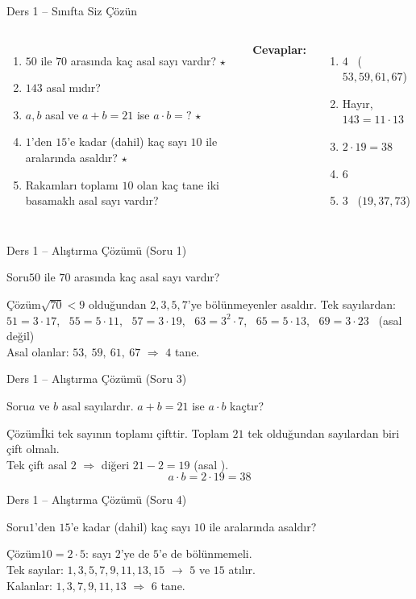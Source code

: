 \documentclass[aspectratio=169,11pt,handout]{beamer}
\newcommand{\soru}[3]{%
\begin{frame}{#1}
  \begin{block}{Soru}\large #2\end{block}
  \pause
  \begin{exampleblock}{Çözüm}\large #3\end{exampleblock}
\end{frame}}
\begin{document}
\begin{frame}{Ders 1 -- Sınıfta Siz Çözün}
\begin{columns}[t]
\begin{enumerate}
\item \(50\) ile \(70\) arasında kaç asal sayı vardır? \(\star\)
\item \(143\) asal mıdır?
\item \(a,b\) asal ve \(a+b=21\) ise \(a\cdot b=?\) \(\star\)
\item \(1\)'den \(15\)'e kadar (dahil) kaç sayı \(10\) ile aralarında asaldır? \(\star\)
\item Rakamları toplamı \(10\) olan kaç tane iki basamaklı asal sayı vardır?
\end{enumerate}
\pause
\textbf{Cevaplar:}
\begin{enumerate}
\item \(4\) \ (\(53,59,61,67\))
\item Hayır, \(143=11\cdot 13\)
\item \(2\cdot 19=38\)
\item \(6\)
\item \(3\) \ (\(19,37,73\))
\end{enumerate}
\end{columns}
\vspace{4pt}{\footnotesize \(\star\) işaretli soruların adım adım çözümü sonraki slaytlardadır.}
\end{frame}

\soru{Ders 1 -- Alıştırma Çözümü (Soru 1)}
{\(50\) ile \(70\) arasında kaç asal sayı vardır?}
{\(\sqrt{70}<9\) olduğundan \(2,3,5,7\)'ye bölünmeyenler asaldır. Tek sayılardan:\\[3pt]
\(51=3\cdot17\), \ \(55=5\cdot 11\), \ \(57=3\cdot 19\), \ \(63=3^2\cdot 7\), \ \(65=5\cdot 13\), \ \(69=3\cdot 23\) \ (asal değil)\\[3pt]
Asal olanlar: \(53,\ 59,\ 61,\ 67\) \(\Rightarrow\) \(4\) tane.}

\soru{Ders 1 -- Alıştırma Çözümü (Soru 3)}
{\(a\) ve \(b\) asal sayılardır. \(a+b=21\) ise \(a\cdot b\) kaçtır?}
{İki tek sayının toplamı çifttir. Toplam \(21\) tek olduğundan sayılardan biri çift olmalı.\\[3pt]
Tek çift asal \(2\) \(\Rightarrow\) diğeri \(21-2=19\) (asal \checkmark).
\[a\cdot b=2\cdot 19=38\]}

\soru{Ders 1 -- Alıştırma Çözümü (Soru 4)}
{\(1\)'den \(15\)'e kadar (dahil) kaç sayı \(10\) ile aralarında asaldır?}
{\(10=2\cdot 5\): sayı \(2\)'ye de \(5\)'e de bölünmemeli.\\[3pt]
Tek sayılar: \(1,3,5,7,9,11,13,15\) \quad \(\rightarrow\) \(5\) ve \(15\) atılır.\\[3pt]
Kalanlar: \(1,3,7,9,11,13\) \(\Rightarrow\) \(6\) tane.}
\end{document}
